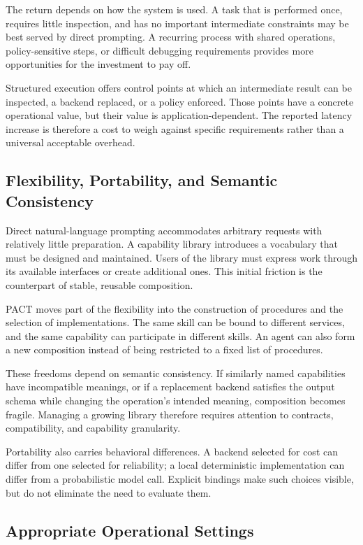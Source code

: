 \documentclass[10pt,twocolumn,a4paper]{article}
\begin{document}
The return depends on how the system is used. A task that is performed once, requires little inspection, and has no important intermediate constraints may be best served by direct prompting. A recurring process with shared operations, policy-sensitive steps, or difficult debugging requirements provides more opportunities for the investment to pay off.


Structured execution offers control points at which an intermediate result can be inspected, a backend replaced, or a policy enforced. Those points have a concrete operational value, but their value is application-dependent. The reported latency increase is therefore a cost to weigh against specific requirements rather than a universal acceptable overhead.


\subsection{Flexibility, Portability, and Semantic Consistency}

Direct natural-language prompting accommodates arbitrary requests with relatively little preparation. A capability library introduces a vocabulary that must be designed and maintained. Users of the library must express work through its available interfaces or create additional ones. This initial friction is the counterpart of stable, reusable composition.


PACT moves part of the flexibility into the construction of procedures and the selection of implementations. The same skill can be bound to different services, and the same capability can participate in different skills. An agent can also form a new composition instead of being restricted to a fixed list of procedures.


These freedoms depend on semantic consistency. If similarly named capabilities have incompatible meanings, or if a replacement backend satisfies the output schema while changing the operation's intended meaning, composition becomes fragile. Managing a growing library therefore requires attention to contracts, compatibility, and capability granularity.


Portability also carries behavioral differences. A backend selected for cost can differ from one selected for reliability; a local deterministic implementation can differ from a probabilistic model call. Explicit bindings make such choices visible, but do not eliminate the need to evaluate them.


\subsection{Appropriate Operational Settings}
\end{document}

